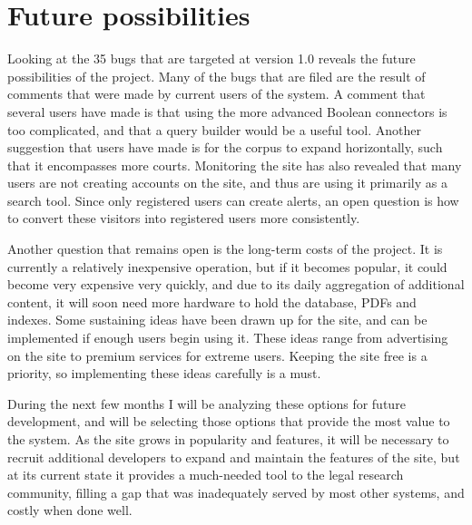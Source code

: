 \label{future}
\section{Future possibilities}
Looking at the 35 bugs that are targeted at version 1.0 reveals the future possibilities of the project. Many of the bugs that are filed are the result of comments that were made by current users of the system. A comment that several users have made is that using the more advanced Boolean connectors is too complicated, and that a query builder would be a useful tool. Another suggestion that users have made is for the corpus to expand horizontally, such that it encompasses more courts. Monitoring the site has also revealed that many users are not creating accounts on the site, and thus are using it primarily as a search tool. Since only registered users can create alerts, an open question is how to convert these visitors into registered users more consistently. 

Another question that remains open is the long-term costs of the project. It is currently a relatively inexpensive operation, but if it becomes popular, it could become very expensive very quickly, and due to its daily aggregation of additional content, it will soon need more hardware to hold the database, PDFs and indexes. Some sustaining ideas have been drawn up for the site, and can be implemented if enough users begin using it. These ideas range from advertising on the site to premium services for extreme users. Keeping the site free is a priority, so implementing these ideas carefully is a must.

During the next few months I will be analyzing these options for future development, and will be selecting those options that provide the most value to the system. As the site grows in popularity and features, it will be necessary to recruit additional developers to expand and maintain the features of the site, but at its current state it provides a much-needed tool to the legal research community, filling a gap that was inadequately served by most other systems, and costly when done well.
